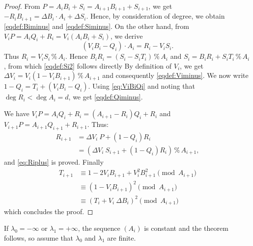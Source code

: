 \documentclass{sig-alternate-05-2015}
\renewcommand{\mod}{\,\%\,}
\theoremstyle{definition}
\begin{document}
\begin{proof}
From $P= A_i B_i + S_i= A_{i+1} B_{i+1} + S_{i+1}$, we get
$- R_i B_{i+1}= \Delta B_i \cdot A_i + \Delta S_i$.
Hence, by consideration of degree, we obtain \eqref{eqdef:Biminus} 
and \eqref{eqdef:Siminus}.
On the other hand, from $V_i P = A_i Q_i + R_i=V_i (A_i B_i + S_i)$, we 
derive
\begin{equation}
\label{eq:ViBiQi} 
(V_i B_i -Q_i) \cdot A_i=R_i-V_i S_i. 
\end{equation} 
Thus $R_i=V_i S_i \mod A_i$.
Hence $B_i R_i = (S_i - S_i T_i) \mod A_i$ and $S_i = B_i R_i + S_i T_i 
\mod A_i$, from which \eqref{eqdef:Si2} follows directly 
By definition of $V_i$, we get $\Delta V_i = V_i (1-V_i B_{i+1}) \mod A_{i+1}$ and consequently \eqref{eqdef:Viminus}.
We now write $1-Q_i= T_i + (V_i B_i - Q_i)$. Using \eqref{eq:ViBiQi} and
noting that $\deg R_i < \deg A_i = d$, we 
get \eqref{eqdef:Qiminus}.

We have $V_i P=A_i Q_i+R_i=(A_{i+1}-R_i)Q_i+R_i$ and $V_{i+1} P=A_{i+1} 
Q_{i+1}+R_{i+1}$. Thus:
\begin{align*}
R_{i+1} &= \Delta V_i \: P + (1-Q_i)R_i \\
 &= (\Delta V_i \: S_{i+1} + (1-Q_i)R_i) \mod A_{i+1},
\end{align*} 
and \eqref{eq:Riplus} is proved. Finally
\begin{align*}
T_{i+1} &\equiv 1-2V_i B_{i+1}+V_i^2 B_{i+1}^2 \pmod {A_{i+1}} \\
&\equiv (1-V_i B_{i+1})^2 \pmod {A_{i+1}} \\
&\equiv (T_i + V_i \: \Delta B_i)^2 \pmod {A_{i+1}}
\end{align*}
which concludes the proof.
\end{proof}

If $\lambda_0 = -\infty$ or $\lambda_1 = +\infty$, the sequence $(A_i)$
is constant and the theorem follows, so assume that $\lambda_0$
and $\lambda_1$ are finite.
\end{document}
